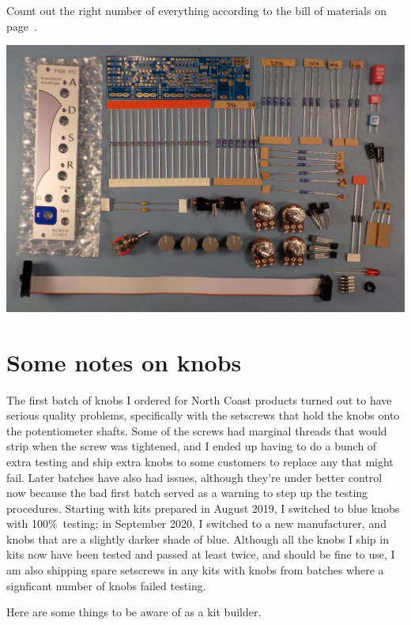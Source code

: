 Count out the right number of everything according to the bill of materials
on page~\pageref{cha:bom}. 

{\nopagebreak
\noindent\includegraphics[width=\linewidth]{board-parts.jpg}}

\section{Some notes on knobs}

The first batch of knobs I ordered for North Coast products turned out to
have serious quality problems, specifically with the setscrews that hold the
knobs onto the potentiometer shafts.  Some of the screws had marginal
threads that would strip when the screw was tightened, and I ended up having
to do a bunch of extra testing and ship extra knobs to some customers to
replace any that might fail.  Later batches have also had issues, although
they're under better control now because the bad first batch served as a
warning to step up the testing procedures.  Starting with kits prepared in
August 2019, I switched to blue knobs with 100\%\ testing; in September
2020, I switched to a new manufacturer, and knobs that are a slightly darker
shade of blue.  Although all the knobs I ship in kits now have been tested
and passed at least twice, and should be fine to use, I am also shipping
spare setscrews in any kits with knobs from batches where a signficant
number of knobs failed testing.

Here are some things to be aware of as a kit builder.

